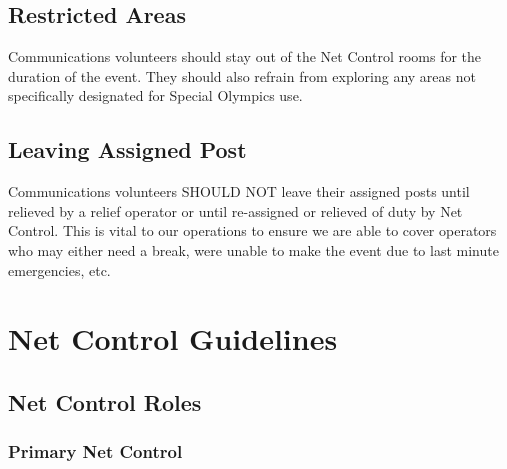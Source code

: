\documentclass[pdflatex,letterpaper,twoside,12pt]{book}
\begin{document}

\section{Restricted Areas}

Communications volunteers should stay out of the Net Control rooms for the duration of the event. They should also refrain from exploring any areas not specifically designated for Special Olympics use.


\section{Leaving Assigned Post}

Communications volunteers SHOULD NOT leave their assigned posts until relieved by a relief operator or until re-assigned or relieved of duty by Net Control. This is vital to our operations to ensure we are able to cover operators who may either need a break, were unable to make the event due to last minute emergencies, etc.


\chapter{Net Control Guidelines}


\section{Net Control Roles}

\subsection{Primary Net Control}
\end{document}

